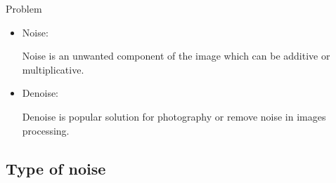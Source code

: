 \documentclass{beamer}
\begin{document}
\begin{frame}{Problem}



\begin{itemize}



\item Noise:

Noise is an unwanted component of the image which can
be additive or multiplicative.

\vspace{7mm}

\item Denoise:

Denoise is popular solution for photography or remove noise in images processing.



\end{itemize}






\end{frame}

\subsection{Type of noise}
\end{document}
